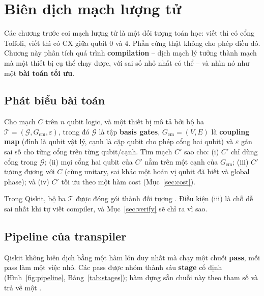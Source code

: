 \section{Biên dịch mạch lượng tử}
\label{sec:compilation}

Các chương trước coi mạch lượng tử là một đối tượng toán học: viết  thì có cổng
Toffoli, viết  thì có CX giữa qubit 0 và 4. Phần cứng thật không cho phép điều đó.
Chương này phân tích quá trình \textbf{compilation} -- dịch mạch lý tưởng thành mạch mà một thiết bị
cụ thể chạy được, với sai số nhỏ nhất có thể -- và nhìn nó như một \textbf{bài toán tối ưu}.

\subsection{Phát biểu bài toán}

\begin{definition}
Cho mạch $C$ trên $n$ qubit logic, và một thiết bị mô tả bởi bộ ba
$\mathcal{T} = (\mathcal{G}, G_{\text{cm}}, \varepsilon)$, trong đó $\mathcal{G}$ là tập
\textbf{basis gates}, $G_{\text{cm}} = (V, E)$ là \textbf{coupling map} (đỉnh là qubit vật lý, cạnh
là cặp qubit cho phép cổng hai qubit) và $\varepsilon$ gán sai số cho từng cổng trên từng qubit/cạnh.
Tìm mạch $C'$ sao cho: (i) $C'$ chỉ dùng cổng trong $\mathcal{G}$; (ii) mọi cổng hai qubit của $C'$
nằm trên một cạnh của $G_{\text{cm}}$; (iii) $C'$ tương đương với $C$ (cùng unitary, sai khác một
hoán vị qubit đã biết và global phase); và (iv) $C'$ tối ưu theo một hàm cost (Mục~\ref{sec:cost}).
\end{definition}

Trong Qiskit, bộ ba $\mathcal{T}$ được đóng gói thành đối tượng . Điều kiện (iii) là chỗ
dễ sai nhất khi tự viết compiler, và Mục~\ref{sec:verify} sẽ chỉ ra vì sao.

\subsection{Pipeline của transpiler}

Qiskit không biên dịch bằng một hàm lớn duy nhất mà chạy một chuỗi \textbf{pass}, mỗi pass làm một
việc nhỏ. Các pass được nhóm thành sáu \textbf{stage} cố định (Hình~\ref{fig:pipeline},
Bảng~\ref{tab:stages}); hàm  dựng sẵn chuỗi này theo tham số
 và trả về một .

